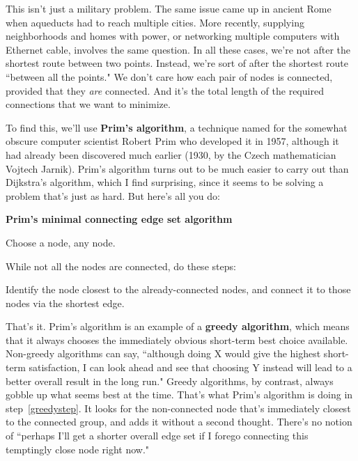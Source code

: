 This isn't just a military problem. The same issue came up in ancient Rome
when aqueducts had to reach multiple cities. More recently, supplying
neighborhoods and homes with power, or networking multiple computers with
Ethernet cable, involves the same question. In all these cases, we're not
after the shortest route between two points. Instead, we're sort of after
the shortest route ``between all the points." We don't care how each pair
of nodes is connected, provided that they \textit{are} connected. And it's
the total length of the required connections that we want to minimize.

To find this, we'll use \textbf{Prim's algorithm}, a technique named for
the somewhat obscure computer scientist Robert Prim who developed it in
1957, although it had already been discovered much earlier (1930, by the
Czech mathematician Vojtech Jarnik). Prim's algorithm turns out to be much
easier to carry out than Dijkstra's algorithm, which I find surprising,
since it seems to be solving a problem that's just as hard. But here's all
you do:

\vspace{.1in}
\begin{samepage}
\begin{framed}
\textbf{Prim's minimal connecting edge set algorithm}
\begin{compactenum}
\item Choose a node, any node.
\item While not all the nodes are connected, do these steps:
    \begin{compactenum}
    \item \label{greedystep} Identify the node closest to the 
already-connected nodes, and connect it to those nodes via the shortest
edge.
    \end{compactenum}
\end{compactenum}
\end{framed}
\end{samepage}

That's it. Prim's algorithm is an example of a \textbf{greedy algorithm},
which means that it always chooses the immediately obvious short-term best
choice available. Non-greedy algorithms can say, ``although doing X would
give the highest short-term satisfaction, I can look ahead and see that
choosing Y instead will lead to a better overall result in the long run."
Greedy algorithms, by contrast, always gobble up what seems best at the
time. That's what Prim's algorithm is doing in step~\ref{greedystep}. It
looks for the non-connected node that's immediately closest to the
connected group, and adds it without a second thought. There's no notion of
``perhaps I'll get a shorter overall edge set if I forego connecting this
temptingly close node right now."

